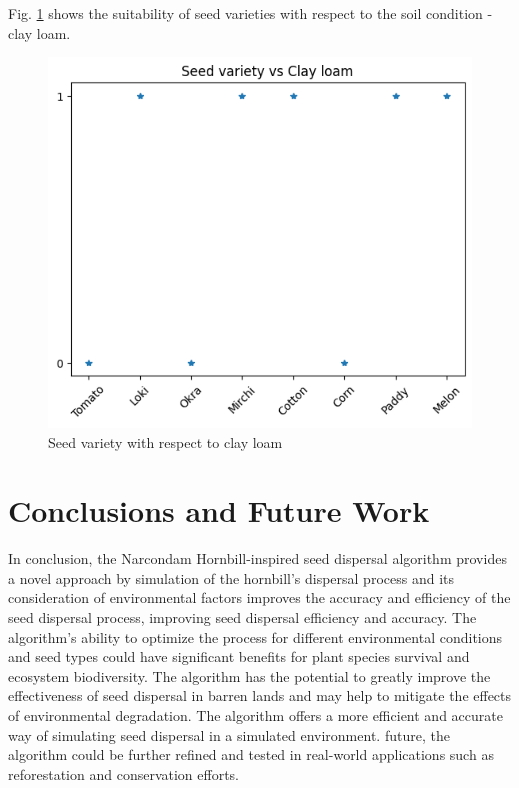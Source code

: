\documentclass[conference]{IEEEtran}
\begin{document}
Fig. \ref{dt} shows the suitability of seed varieties with respect to the soil condition - clay loam.
\begin{figure}[htp]
    \centering
    \includegraphics[scale=0.4]{download (4).png}
    \caption{Seed variety with respect to clay loam}
    \label{dt}
\end{figure}


\section{Conclusions and Future Work}
In conclusion, the Narcondam Hornbill-inspired seed dispersal algorithm provides a novel approach by simulation of the hornbill's dispersal process and its consideration of environmental factors improves the accuracy and efficiency of the seed dispersal process, improving seed dispersal efficiency and accuracy. The algorithm's ability to optimize the process for different environmental conditions and seed types could have significant benefits for plant species survival and ecosystem biodiversity. The algorithm has the potential to greatly improve the effectiveness of seed dispersal in barren lands and may help to mitigate the effects of environmental degradation. The algorithm offers a more efficient and accurate way of simulating seed dispersal in a simulated environment. future, the algorithm could be further refined and tested in real-world applications such as reforestation and conservation efforts.
\end{document}

